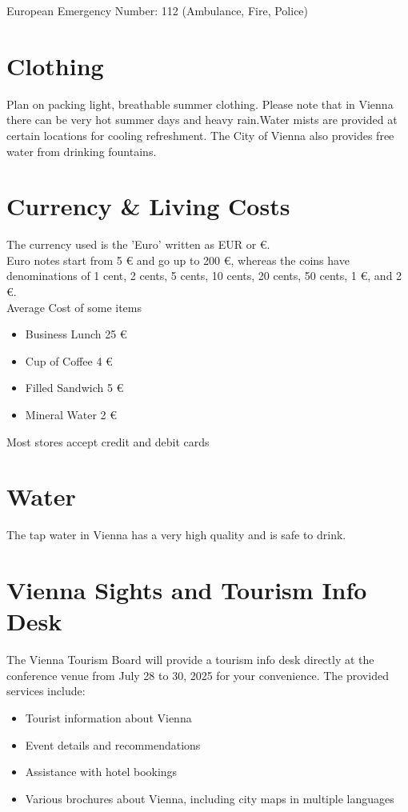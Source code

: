 European Emergency Number: 112 (Ambulance, Fire, Police)

\section*{Clothing}

Plan on packing light, breathable summer clothing. Please note that in Vienna there can be very hot summer days and heavy rain.Water mists are provided at certain locations for cooling refreshment. The City of Vienna also provides free water from drinking fountains.

\section*{Currency \& Living Costs}

The currency used is the 'Euro’ written as EUR or €.\\

Euro notes start from 5 € and go up to 200 €, whereas the coins have denominations of 1 cent, 2 cents, 5 cents, 10 cents, 20 cents, 50 cents, 1 €, and 2 €.\\

Average Cost of some items
\begin{itemize}
\item Business Lunch  25 €
\item Cup of Coffee  4 €
\item Filled Sandwich  5 €
\item Mineral Water  2 €
\end{itemize}

Most stores accept credit and debit cards

\section*{Water}
The tap water in Vienna has a very high quality and is safe to drink.

\section*{Vienna Sights and Tourism Info Desk}

The Vienna Tourism Board will provide a tourism info desk directly at the conference venue from July 28 to 30, 2025 for your convenience. The provided services include:

\begin{itemize}

\item Tourist information about Vienna
\item Event details and recommendations
\item Assistance with hotel bookings
\item Various brochures about Vienna, including city maps in multiple languages

\end{itemize}

